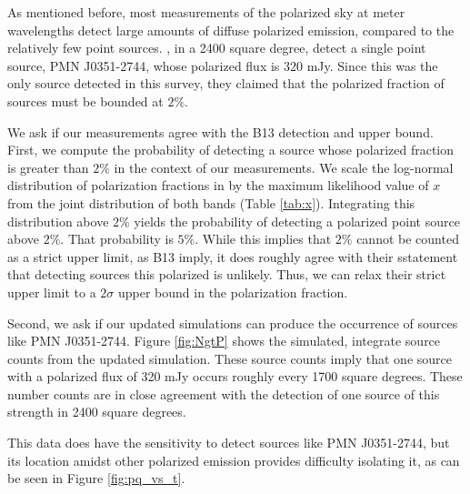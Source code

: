 As mentioned before, most measurements of the polarized sky at meter wavelengths detect large
amounts of diffuse polarized emission, compared to the relatively few point sources.
\citet[][abbreviated in this section as B13]{Bernardi2013}, in a 2400 square degree, detect a single
point source, PMN J0351-2744, whose polarized flux is 320 mJy. Since this was the only source
detected in this survey, they claimed that the polarized fraction of sources must be bounded at
$2\%$.

We ask if our measurements agree with the B13 detection and upper bound. First, we compute the
probability of detecting a source whose polarized fraction is greater than $2\%$ in the context of
our measurements. We scale the log-normal distribution of polarization fractions in \citet{Tucci2012}
by the maximum likelihood value of $x$ from the joint distribution of both bands (Table
\ref{tab:x}). Integrating this distribution above $2\%$  yields the probability of detecting a
polarized point source above $2\%$. That probability is $5\%$. While this implies that $2\%$ cannot
be counted as a strict upper limit, as B13 imply, it does roughly agree with their sstatement that
detecting sources this polarized is unlikely. Thus, we can relax their strict upper limit to a
$2\sigma$ upper bound in the polarization fraction.

Second, we ask if our updated simulations can produce the occurrence of sources like PMN J0351-2744.
Figure \ref{fig:NgtP} shows the simulated, integrate source counts from the updated simulation.
These source counts imply that one source with a polarized flux of 320 mJy occurs roughly every 1700
square degrees. These number counts are in close agreement with the detection of one source of this
strength in 2400 square degrees.

This data does have the sensitivity to detect sources like PMN J0351-2744, but its location amidst
other polarized emission provides difficulty isolating it, as can be seen in Figure
\ref{fig:pq_vs_t}.

